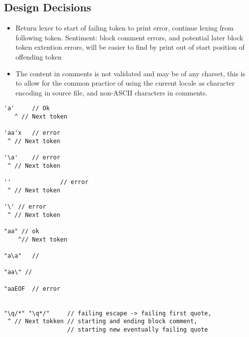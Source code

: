 \subsection{Design Decisions}


\begin{itemize}
	\item Return lexer to start of failing token to print error, continue lexing from following token.
	Sentiment: block comment errors, and potential later block token extention errors, will be easier to find by print out of start position of offending token
	\item The content in comments is not validated and may be of any charset, this is to allow for the common practice of using the current locale as character encoding in source file, and non-ASCII characters in comments.
\end{itemize}

\begin{verbatim}
'a'     // Ok
   ^ // Next token

'aa'x   // error
 ^ // Next token

'\a'    // error
 ^ // Next token

''              // error
 ^ // Next token

'\' // error
 ^ // Next token

"aa" // ok
    ^// Next token

"a\a"   //

"aa\" //

"aaEOF  // error


"\q/*" "\q*/"     // failing escape -> failing first quote,
 ^ // Next tokken // starting and ending block comment,
                  // starting new eventually failing quote
\end{verbatim}

